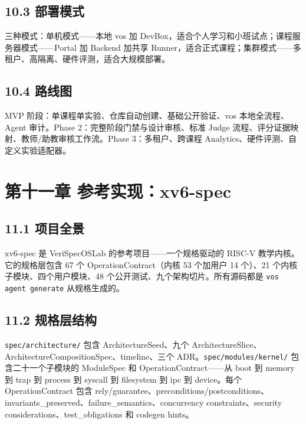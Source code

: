 \documentclass[UTF8,a4paper,12pt,openany]{ctexrep}
\newcommand{\passthrough}[1]{#1}
\begin{document}
\section{10.3 部署模式}\label{103-ux90e8ux7f72ux6a21ux5f0f}

三种模式：单机模式------本地 vos 加 DevBox，适合个人学习和小班试点；课程服务器模式------Portal 加 Backend 加共享 Runner，适合正式课程；集群模式------多租户、高隔离、硬件评测，适合大规模部署。

\section{10.4 路线图}\label{104-ux8defux7ebfux56fe}

MVP 阶段：单课程单实验、仓库自动创建、基础公开验证、vos 本地全流程、Agent 审计。Phase 2：完整阶段门禁与设计审核、标准 Judge 流程、评分证据映射、教师/助教审核工作流。Phase 3：多租户、跨课程 Analytics、硬件评测、自定义实验适配器。


\chapter{第十一章 参考实现：xv6-spec}\label{ux7b2cux5341ux4e00ux7ae0-ux53c2ux8003ux5b9eux73b0xv6-spec}

\section{11.1 项目全景}\label{111-ux9879ux76eeux5168ux666f}

xv6-spec 是 VeriSpecOSLab 的参考项目------一个规格驱动的 RISC-V 教学内核。它的规格层包含 67 个 OperationContract（内核 53 个加用户 14 个）、21 个内核子模块、四个用户模块、48 个公开测试、九个架构切片。所有源码都是 \passthrough{\lstinline!vos agent generate!} 从规格生成的。

\section{11.2 规格层结构}\label{112-ux89c4ux683cux5c42ux7ed3ux6784}

\passthrough{\lstinline!spec/architecture/!} 包含 ArchitectureSeed、九个 ArchitectureSlice、ArchitectureCompositionSpec、timeline、三个 ADR。\passthrough{\lstinline!spec/modules/kernel/!} 包含二十一个子模块的 ModuleSpec 和 OperationContract------从 boot 到 memory 到 trap 到 process 到 syscall 到 filesystem 到 ipc 到 device。每个 OperationContract 包含 rely/guarantee、preconditions/postconditions、invariants\_preserved、failure\_semantics、concurrency constraints、security considerations、test\_obligations 和 codegen hints。
\end{document}
